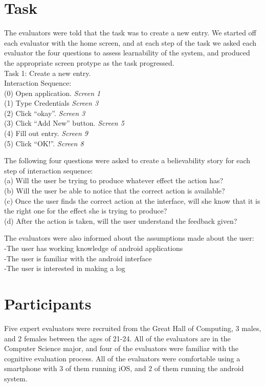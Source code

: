 \documentclass[pdftex,12pt,a4paper]{report}
\begin{document}
\section{Task}

The evaluators were told that the task was to create a new entry. We started off each evaluator with the home screen, and at each step of the task we asked each evaluator the four questions to assess learnability of the system, and produced the appropriate screen protype as the task progressed. 
\vspace{12pt}
\\Task 1: Create a new entry. 
\\Interaction Sequence:
\vspace{12pt}
 \\(0) Open application.  \textit{Screen 1}
 \\(1) Type Credentials \textit{Screen 3}
 \\(2) Click ``okay''.  \textit{Screen 3}
 \\(3) Click ``Add New'' button.  \textit{Screen 5}
 \\(4) Fill out entry.  \textit{Screen 9}
 \\(5) Click ``OK!''.  \textit{Screen 8}
\vspace{12pt}

The following four questions were asked to create a believability story for each step of interaction sequence:
\vspace{12pt}
\\(a) Will the user be trying to produce whatever effect the action has?
\\(b) Will the user be able to notice that the correct action is available?
\\(c) Once the user finds the correct action at the interface, will she know that it is the right one for the effect she is trying to produce?
\\(d) After the action is taken, will the user understand the feedback given?

\noindent The evaluators were also informed about the assumptions made about the user:
\\\indent -The user has working knowledge of android applications
\\\indent -The user is familiar with the android interface
\\\indent -The user is interested in making a log

\section{Participants}
Five expert evaluators were recruited from the Great Hall of Computing, 3 males, and 2 females between the ages of 21-24. All of the evaluators are in the Computer Science major, and four of the evaluators were familiar with the cognitive evaluation process. All of the evaluators were comfortable using a smartphone with 3 of them running iOS, and 2 of them running the android system.
\end{document}
